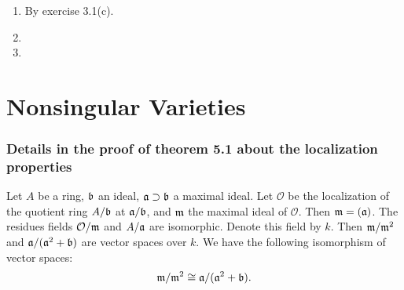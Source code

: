 \documentclass{note}
\begin{document}
\begin{enumerate}
\item By exercise 3.1(c).
\item
\item
\end{enumerate}

\section{Nonsingular Varieties}
\subsubsection*{Details in the proof of theorem 5.1 about the
  localization properties}
\begin{proposition*}
  Let $A$ be a ring, $\mathfrak{b}$ an ideal,
  $\mathfrak{a} \supset \mathfrak{b}$ a maximal ideal. Let $\mathcal{O}$ be
  the localization of the quotient ring $A/\mathfrak{b}$ at
  $\mathfrak{a}/\mathfrak{b}$, and $\mathfrak{m}$ the maximal ideal of
  $\mathcal{O}$. Then $\mathfrak{m} = (\mathfrak{a})$. The residues fields
  $\mathcal{O}/\mathfrak{m}$ and $A/\mathfrak{a}$ are isomorphic. Denote
  this field by $k$. Then $\mathfrak{m}/\mathfrak{m}^2$ and
  $\mathfrak{a}/(\mathfrak{a}^2+\mathfrak{b})$ are vector spaces over $k$. We
  have the following isomorphism of vector spaces:
  \begin{equation*}
    \mathfrak{m}/\mathfrak{m}^2 \cong \mathfrak{a}/(\mathfrak{a}^2+\mathfrak{b}).
  \end{equation*}
\end{proposition*}
\end{document}
